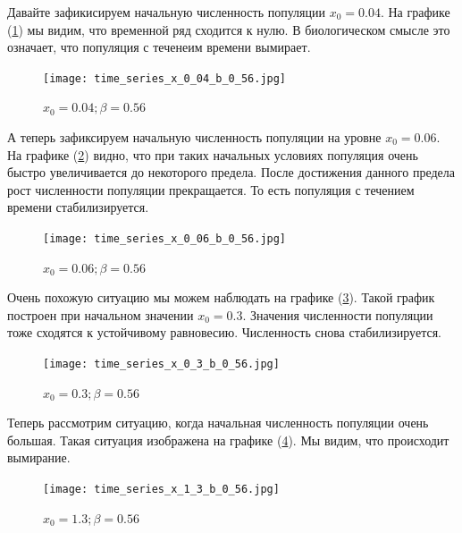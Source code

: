         Давайте зафикисируем начальную численность популяции \(x_0 = 0.04\). На графике (\ref{time_series_x_0_04_b_0_56}) мы видим, что временной ряд сходится к нулю. В биологическом смысле это означает, что популяция с теченеим времени вымирает.
    
        \begin{figure}
            \centering
            \texttt{[image: time\_series\_x\_0\_04\_b\_0\_56.jpg]}

            \captionsetup{justification=centering}
            \caption{\(x_0 = 0.04; \beta = 0.56\)}
            \label{time_series_x_0_04_b_0_56}
        \end{figure}

        А теперь зафиксируем начальную численность популяции на уровне \(x_0 = 0.06\). На графике (\ref{time_series_x_0_06_b_0_56}) видно, что при таких начальных условиях популяция очень быстро увеличивается до некоторого предела. После достижения данного предела рост численности популяции прекращается. То есть популяция с течением времени стабилизируется.
    
        \begin{figure}
            \centering
            \texttt{[image: time\_series\_x\_0\_06\_b\_0\_56.jpg]}

            \captionsetup{justification=centering}
            \caption{\(x_0 = 0.06; \beta = 0.56\)}
            \label{time_series_x_0_06_b_0_56}
        \end{figure}

        Очень похожую ситуацию мы можем наблюдать на графике (\ref{time_series_x_0_3_b_0_56}). Такой график построен при начальном значении \(x_0 = 0.3\). Значения численности популяции тоже сходятся к устойчивому равновесию. Численность снова стабилизируется.
    
        \begin{figure}
            \centering
            \texttt{[image: time\_series\_x\_0\_3\_b\_0\_56.jpg]}

            \captionsetup{justification=centering}
            \caption{\(x_0 = 0.3; \beta = 0.56\)}
            \label{time_series_x_0_3_b_0_56}
        \end{figure}

        Теперь рассмотрим ситуацию, когда начальная численность популяции очень большая. Такая ситуация изображена на графике (\ref{time_series_x_1_2_b_0_56}). Мы видим, что происходит вымирание.
    
        \begin{figure}
            \centering
            \texttt{[image: time\_series\_x\_1\_3\_b\_0\_56.jpg]}

            \captionsetup{justification=centering}
            \caption{\(x_0 = 1.3; \beta = 0.56\)}
            \label{time_series_x_1_2_b_0_56}
        \end{figure}

